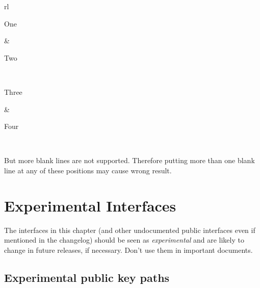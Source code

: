 \documentclass[oneside]{book}
\renewcommand\emph[1]{\textit{\color{red3}#1}}
\newcommand{\mywarning}[1]{%
  \begin{tcolorbox}
  #1
  \end{tcolorbox}%
}
\begin{document}
{\begin{demohigh}
\begin{tblr}{rl}
\hline

  One

  &

  Two

  \\

\hline

  Three

  &

  Four

  \\

\hline

\end{tblr}
\end{demohigh}

But more blank lines are not supported.
Therefore putting more than one blank line at any of these positions may cause wrong result.


\chapter{Experimental Interfaces}
\label{chap:exp}

\mywarning{The interfaces in this chapter
(and other undocumented public interfaces even if mentioned in the changelog) should be seen as \emph{experimental}
and are likely to change in future releases, if necessary. Don’t use them in important documents.}

\section{Experimental public key paths}

}
\end{document}
